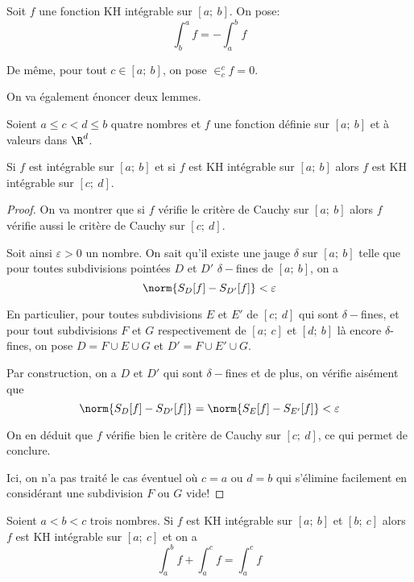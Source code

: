 \begin{de}
Soit $f$ une fonction KH intégrable sur $[a;~b]$. On pose:
\[
\int_b^a f = -\int_a^b f
\]

De même, pour tout $c \in [a;~b]$, on pose $\in_c^c f = 0$.
\end{de}

On va également énoncer deux lemmes.

\begin{lem}
Soient $a \leq c<d \leq b$ quatre nombres et $f$ une fonction définie sur $[a;~b]$ et à valeurs dans $\R^d$.

Si $f$ est intégrable sur $[a;~b]$ et si $f$ est KH intégrable sur $[a;~b]$ alors $f$ est KH intégrable sur $[c;~d]$.
\end{lem}

\begin{proof}
On va montrer que si $f$ vérifie le critère de Cauchy sur $[a;~b]$ alors $f$ vérifie aussi le critère de Cauchy sur $[c;~d]$.

Soit ainsi $\varepsilon>0$ un nombre. On sait qu'il existe une jauge $\delta$ sur $[a;~b]$ telle que pour toutes subdivisions pointées $D$ et $D'$ $\delta-$fines de $[a;~b]$, on a
\[
\norm{S_D[f]-S_{D'}[f]} < \varepsilon
\]

En particulier, pour toutes subdivisions $E$ et $E'$ de $[c;~d]$ qui sont $\delta-$fines, et pour tout subdivisions $F$ et $G$ respectivement de $[a;~c]$ et $[d;~b]$ là encore $\delta$-fines, on pose $D = F \cup E \cup G$ et $D' = F \cup E' \cup G$.

Par construction, on a $D$ et $D'$ qui sont $\delta-$fines et de plus, on vérifie aisément que 
\[
\norm{S_D[f]-S_{D'}[f]} = \norm{S_E[f]-S_{E'}[f]} < \varepsilon
\]

On en déduit que $f$ vérifie bien le critère de Cauchy sur $[c;~d]$, ce qui permet de conclure.

Ici, on n'a pas traité le cas éventuel où $c=a$ ou $d=b$ qui s'élimine facilement en considérant une subdivision $F$ ou $G$ vide!
\end{proof}

\begin{lem}
Soient $a<b<c$ trois nombres. Si $f$ est KH intégrable sur $[a;~b]$ et $[b;~c]$ alors $f$ est KH intégrable sur $[a;~c]$ et on a
\[
\int_a^b f + \int_a^c f = \int_a^c f
\]
\end{lem}

